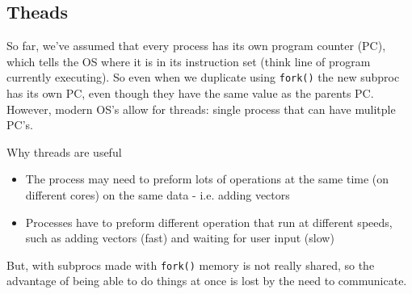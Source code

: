 \documentclass[a4paper, 10pt]{article}
\begin{document}
\subsection{Theads}
So far, we've assumed that every process has its own program counter (PC), which tells the OS where it is in its instruction set (think line of program currently executing). So even when we duplicate using \texttt{fork()} the new subproc has its own PC, even though they have the same value as the parents PC. \\[2ex]
However, modern OS's allow for threads: single process that can have mulitple PC's.

\begin{conceptbox}{Why threads are useful}{}
    \begin{itemize}
        \item The process may need to preform lots of operations at the same time (on different cores) on the same data - i.e. adding vectors
        \item Processes have to preform different operation that run at different speeds, such as adding vectors (fast) and waiting for user input (slow)
    \end{itemize}
\end{conceptbox}
But, with subprocs made with \texttt{fork()} memory is not really shared, so the advantage of being able to do things at once is lost by the need to communicate.
\end{document}
